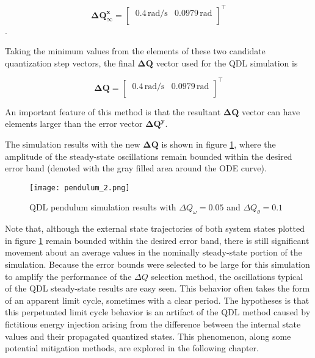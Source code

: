 \begin{equation} \label{eq:pendulum_dq2}
\mathbf{\Delta Q^x_{\infty}} =
\begin{bmatrix}
\ 0.4 \,\text{rad/s} & 0.0979 \,\text{rad} \\
\end{bmatrix}^\top
\end{equation}.

Taking the minimum values from the elements of these two candidate quantization step vectors, the final $\mathbf{\Delta Q}$ vector used for the  QDL simulation is

\begin{equation} \label{eq:pendulum_dq_final}
\mathbf{\Delta Q} =
\begin{bmatrix}
\ 0.4 \,\text{rad/s} & 0.0979 \,\text{rad} \\
\end{bmatrix}^\top
\end{equation}

An important feature of this method is that the resultant $\mathbf{\Delta Q}$ vector can have elements larger than the error vector $\mathbf{\Delta Q^y}$.

The simulation results with the new $\mathbf{\Delta Q}$ is shown in figure \ref{fig:pendulum_2}, where the amplitude of the steady-state oscillations remain bounded within the desired error band (denoted with the gray filled area around the ODE curve). 

\begin{figure}[h]
    \label{fig:pendulum_2}
    \centering
    \texttt{[image: pendulum\_2.png]}
    \caption{QDL pendulum simulation results with $\Delta Q_\omega = 0.05$ and $\Delta Q_\theta = 0.1$}
\end{figure}

Note that, although the external state trajectories of both system states plotted in figure \ref{fig:pendulum_2} remain bounded within the desired error band, there is still significant movement about an average values in the nominally steady-state portion of the simulation. Because the error bounds were selected to be large for this simulation to amplify the performance of the $\Delta Q$ selection method, the oscillations typical of the QDL steady-state results are easy seen. This behavior often takes the form of an apparent limit cycle, sometimes with a clear period. The hypotheses is that this perpetuated limit cycle behavior is an artifact of the QDL method caused by fictitious energy injection arising from the difference between the internal state values and their propagated quantized states. This phenomenon, along some potential mitigation methods, are explored in the following chapter.

